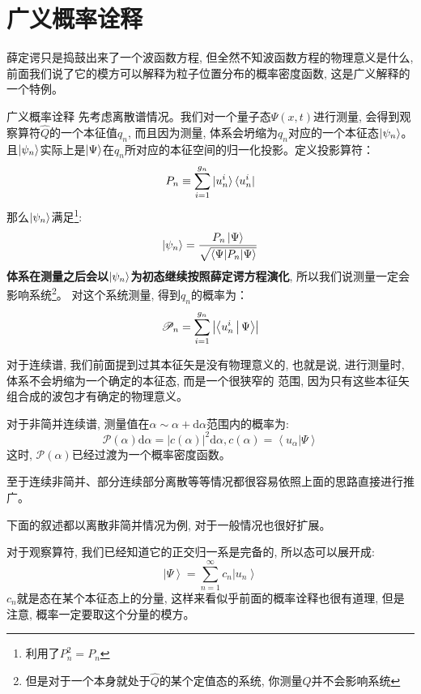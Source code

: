 \documentclass[a4paper,zihao=-4,linespread=1]{ctexrep}
\begin{document}
    \section{广义概率诠释}
    薛定谔只是捣鼓出来了一个波函数方程, 但全然不知波函数方程的物理意义是什么, 前面我们说了它的模方可以解释为粒子位置分布的概率密度函数, 这是广义解释的一个特例。
    \begin{proposition}{广义概率诠释}
        \setlength\parindent{2em}先考虑离散谱情况。我们对一个量子态$\Psi(x,t)$进行测量, 会得到观察算符$\hat{Q}$的一个本征值$q_n$, 而且因为测量, 体系会坍缩为$q_n$对应的一个本征态$\ket{\psi_n}$。
        且$\ket{\psi_n}$实际上是$\ket{\Psi}$在$q_n$所对应的本征空间的归一化投影。定义投影算符：
        \[P_n\equiv\sum\limits_{i=1}^{g_n} \ket{u_n^i} \bra{u_n^i}\]
        那么$\ket{\psi_n}$满足\footnote{利用了$P_n^2=P_n$}:
        \begin{equation}
            \ket{\psi_n}=\frac{P_n\ket{\Psi}}{\sqrt{\braket{\Psi|P_n|\Psi}}}
        \end{equation}
        \textbf{体系在测量之后会以$\ket{\psi_n}$为初态继续按照薛定谔方程演化}, 所以我们说测量一定会影响系统\footnote{但是对于一个本身就处于$\hat Q$的某个定值态的系统, 你测量$Q$并不会影响系统}。
        对这个系统测量, 得到$q_n$的概率为：
        \begin{equation}
            \mathscr{P}_n=\sum\limits_{i=1}^{g_n}\left|\Braket{u_n^i|\Psi}\right|
        \end{equation}
            
        
        \setlength\parindent{2em}对于连续谱, 我们前面提到过其本征矢是没有物理意义的, 也就是说, 进行测量时, 体系不会坍缩为一个确定的本征态, 而是一个很狭窄的
        范围, 因为只有这些本征矢组合成的波包才有确定的物理意义。

        \setlength\parindent{2em}对于非简并连续谱, 测量值在$\alpha\sim\alpha+\mathrm{d}\alpha$范围内的概率为:
        \begin{equation}
            \mathscr{P}(\alpha)\mathrm{d}\alpha=\left|c(\alpha)\right|^2\mathrm{d}\alpha,c(\alpha)=\left \langle u_\alpha  | \Psi  \right \rangle 
        \end{equation}
        这时, $\mathscr{P}(\alpha)$已经过渡为一个概率密度函数。

        \setlength\parindent{2em}至于连续非简并、部分连续部分离散等等情况都很容易依照上面的思路直接进行推广。
    \end{proposition}
    下面的叙述都以离散非简并情况为例, 对于一般情况也很好扩展。

    对于观察算符, 我们已经知道它的正交归一系是完备的, 所以态可以展开成:
    \[\left | \Psi  \right \rangle =\sum\limits_{n=1}^{\infty } c_n\left | u_n \right \rangle \]
    $c_n$就是态在某个本征态上的分量, 这样来看似乎前面的概率诠释也很有道理, 但是注意, 概率一定要取这个分量的模方。
\end{document}
